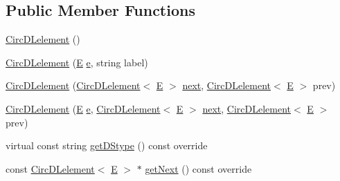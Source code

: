 \subsection*{Public Member Functions}
\begin{DoxyCompactItemize}
\item 
\mbox{\hyperlink{classbridges_1_1_circ_d_lelement_a35279302f5fb5297eeb6efead475921e}{Circ\+D\+Lelement}} ()
\item 
\mbox{\hyperlink{classbridges_1_1_circ_d_lelement_a7dc1ad0eca7c06678064789303c522ed}{Circ\+D\+Lelement}} (\mbox{\hyperlink{namespacebridges_acfb0a4f7877d8f63de3e6862004c50eda3a3ea00cfc35332cedf6e5e9a32e94da}{E}} \mbox{\hyperlink{namespacebridges_acfb0a4f7877d8f63de3e6862004c50edae1671797c52e15f763380b45e841ec32}{e}}, string label)
\item 
\mbox{\hyperlink{classbridges_1_1_circ_d_lelement_a9d0cf8a5b60e3fedc1ba1ad792570934}{Circ\+D\+Lelement}} (\mbox{\hyperlink{classbridges_1_1_circ_d_lelement}{Circ\+D\+Lelement}}$<$ \mbox{\hyperlink{namespacebridges_acfb0a4f7877d8f63de3e6862004c50eda3a3ea00cfc35332cedf6e5e9a32e94da}{E}} $>$ \mbox{\hyperlink{classbridges_1_1_s_lelement_ad7449d10a09ebc52653a7baed812aa43}{next}}, \mbox{\hyperlink{classbridges_1_1_circ_d_lelement}{Circ\+D\+Lelement}}$<$ \mbox{\hyperlink{namespacebridges_acfb0a4f7877d8f63de3e6862004c50eda3a3ea00cfc35332cedf6e5e9a32e94da}{E}} $>$ prev)
\item 
\mbox{\hyperlink{classbridges_1_1_circ_d_lelement_a2e729cd481f11c51bb5b686b8072ec8c}{Circ\+D\+Lelement}} (\mbox{\hyperlink{namespacebridges_acfb0a4f7877d8f63de3e6862004c50eda3a3ea00cfc35332cedf6e5e9a32e94da}{E}} \mbox{\hyperlink{namespacebridges_acfb0a4f7877d8f63de3e6862004c50edae1671797c52e15f763380b45e841ec32}{e}}, \mbox{\hyperlink{classbridges_1_1_circ_d_lelement}{Circ\+D\+Lelement}}$<$ \mbox{\hyperlink{namespacebridges_acfb0a4f7877d8f63de3e6862004c50eda3a3ea00cfc35332cedf6e5e9a32e94da}{E}} $>$ \mbox{\hyperlink{classbridges_1_1_s_lelement_ad7449d10a09ebc52653a7baed812aa43}{next}}, \mbox{\hyperlink{classbridges_1_1_circ_d_lelement}{Circ\+D\+Lelement}}$<$ \mbox{\hyperlink{namespacebridges_acfb0a4f7877d8f63de3e6862004c50eda3a3ea00cfc35332cedf6e5e9a32e94da}{E}} $>$ prev)
\item 
virtual const string \mbox{\hyperlink{classbridges_1_1_circ_d_lelement_a0e199fe681755df694807261ce2460c2}{get\+D\+Stype}} () const override
\item 
const \mbox{\hyperlink{classbridges_1_1_circ_d_lelement}{Circ\+D\+Lelement}}$<$ \mbox{\hyperlink{namespacebridges_acfb0a4f7877d8f63de3e6862004c50eda3a3ea00cfc35332cedf6e5e9a32e94da}{E}} $>$ $\ast$ \mbox{\hyperlink{classbridges_1_1_circ_d_lelement_ac266d60bd2f7ce92cb38a12875a6a468}{get\+Next}} () const override

\end{DoxyCompactItemize}
